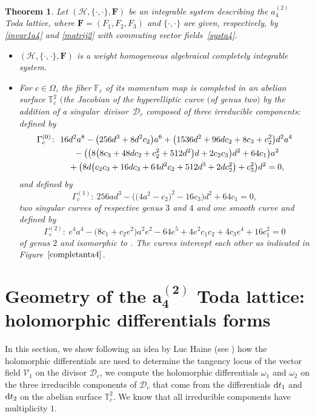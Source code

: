 \documentclass[10pt,a4paper]{amsart}
\numberwithin{equation}{section}
\newtheorem{Theorem}{Theorem}[section]
\begin{document}
\begin{Theorem}
Let $(\mathcal{H}, \{\cdot,\cdot\},\mathbf{F})$ be an
integrable system  describing the $a_4^{(2)}$ Toda lattice, where
$\mathbf{F}=(F_1,F_2,F_3)$ and $\{\cdot,\cdot\}$ are
given, respectively, by \eqref{invar1a4} and \eqref{matrij2} with
commuting vector fields~\eqref{systa4}.
\begin{itemize}\itemsep=0pt
 \item [$(i)$] $(\mathcal{H}, \{\cdot,\cdot\},\mathbf{F})$ is a weight homogeneous
 algebraical completely integrable system.
 \item [$(ii)$] For $c\in \Omega$, the fiber $\mathbb{F}_c$ of its
 momentum map is completed in an abelian surface
 $\mathbb{T}^2_c$ $\bigl($the Jacobian of the hyperelliptic curve $($of genus two$)$ 
 by the addition of a singular~divisor~$\mathcal{D}_c$
 composed of three irreducible components:  defined by
 \begin{gather*}
 \Gamma_c^{(0)}\colon \ 16d^2a^8-\bigl(256d^3+8d^2c_2\bigr)a^6+ \bigl(1536d^2+96dc_2+8c_3+c_2^2\bigr)d^2a^4\\
 \hphantom{\Gamma_c^{(0)}\colon}{} \
 -\bigl(\bigl(8\bigl(8c_3+48dc_2+c_2^2+512d^2\bigr)d+2c_2c_3\bigr)d^2+64c_1\bigr)a^2 \\
 \hphantom{\Gamma_c^{(0)}\colon}{} \
 +\bigl(8d\bigl(c_2c_3+ 16dc_3+64d^2c_2 +512d^3+2dc_2^2\bigr)+c_3^2\bigr)d^2=0,
\end{gather*}
 and
  defined by
\begin{equation*}
 \Gamma_c^{(1)}\colon \ 256ad^3-\bigl(\bigl(4a^2-c_2\bigr)^2-16c_3\bigr)d^2+64c_1=0,
\end{equation*}
two singular curves of respective genus $3$ and $4$ and one
 smooth curve and  defined by
\begin{equation*}
 \Gamma_c^{(2)}\colon \ e^4a^4-\bigl(8c_1+c_2e^2\bigr)a^2e^2-64e^5+4e^2c_1c_2+4c_3e^4+16c_1^2=0
\end{equation*}
 of genus $2$ and isomorphic to \smash{$\overline{\Gamma}_c^{(2)} $}. The curves intercept each other as indicated in Figure~$\ref{completanta4}$.
\end{itemize}
\end{Theorem}

\section[Geometry of the a\_4\^{}(2) Toda lattice: holomorphic differentials forms]{Geometry of the $\boldsymbol{a_4^{(2)}}$ Toda lattice:\\ holomorphic differentials forms}\label{sec4}
In this section, we show following an idea by Luc Haine (see
\cite{Haine}) how the holomorphic differentials are used to
determine the tangency locus of the vector field $\mathcal{V}_1$ on
the divisor $\mathcal{D}_c$, we compute the holomorphic
differentials $\omega_1$ and $\omega_2$ on the three irreducible
components of $\mathcal{D}_c$ that come from the differentials
${\rm d}t_1$ and ${\rm d}t_2$ on the abelian surface $\mathbb{T}^2_c$. We know
that all irreducible components have multiplicity $1$.
\end{document}
